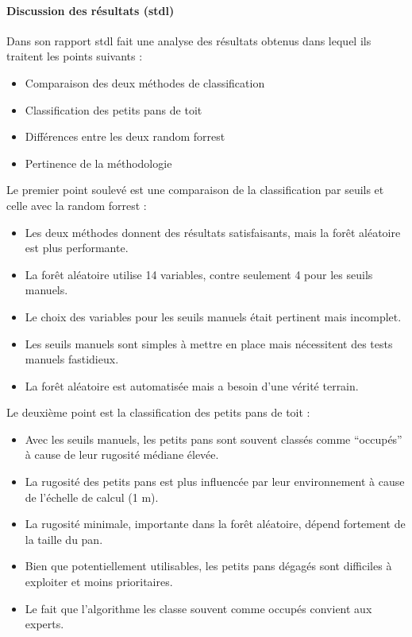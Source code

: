 \paragraph{Discussion des résultats (\acrshort{stdl})}
\par{Dans son rapport \acrshort{stdl} fait une analyse des résultats obtenus dans lequel ils traitent les points suivants :}
\begin{itemize}
    \item Comparaison des deux méthodes de classification
    \item Classification des petits pans de toit
    \item Différences entre les deux random forrest
    \item Pertinence de la méthodologie
\end{itemize}
\par{Le premier point soulevé est une comparaison de la classification par seuils et celle avec la random forrest :}
\begin{itemize}
    \item Les deux méthodes donnent des résultats satisfaisants, mais la forêt aléatoire est plus performante.
    \item La forêt aléatoire utilise 14 variables, contre seulement 4 pour les seuils manuels.
    \item Le choix des variables pour les seuils manuels était pertinent mais incomplet.
    \item Les seuils manuels sont simples à mettre en place mais nécessitent des tests manuels fastidieux.
    \item La forêt aléatoire est automatisée mais a besoin d'une vérité terrain.
\end{itemize}
\par{Le deuxième point est la classification des petits pans de toit :}
\begin{itemize}
    \item Avec les seuils manuels, les petits pans sont souvent classés comme ``occupés'' à cause de leur rugosité médiane élevée.
    \item La rugosité des petits pans est plus influencée par leur environnement à cause de l'échelle de calcul (1 m).
    \item La rugosité minimale, importante dans la forêt aléatoire, dépend fortement de la taille du pan.
    \item Bien que potentiellement utilisables, les petits pans dégagés sont difficiles à exploiter et moins prioritaires.
    \item Le fait que l'algorithme les classe souvent comme occupés convient aux experts.
\end{itemize}

